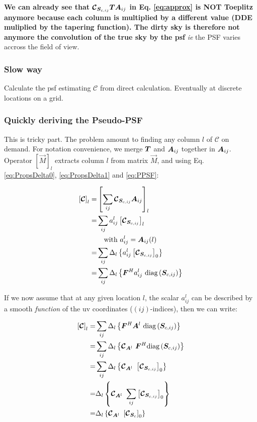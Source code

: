 {\bf We can already see that $\bm{\mathcal{C}}_{\bm{S}_{c,ij}}
  \bm{T}    \bm{A}_{ij}$ in Eq. \ref{eq:approx} is NOT Toeplitz anymore
  because each colunm is multiplied by a different value (DDE
  muliplied by the tapering function). The dirty sky is therefore not
  anymore the convolution of the true sky by the psf} {\it ie} the PSF
varies accross the field of view.

\subsubsection{Slow way}

Calculate the psf estimating $\mathcal{C}$ from direct
calculation. Eventually at discrete locations on a grid.


\subsubsection{Quickly deriving the Pseudo-PSF}

This is tricky part. The problem amount to finding any column $l$ of
$\bm{\mathcal{C}}$ on demand. For notation convenience, we merge
$\bm{T}$ and $\bm{A}_{ij}$ together in $\bm{A}_{ij}$. Operator
$\left[\vec{M}\right]_l$ extracts column $l$ from matrix $\vec{M}$,
and using Eq. \ref{eq:PropsDelta0}, \ref{eq:PropsDelta1} and \ref{eq:PPSF}:

\begin{alignat}{2}
\left[\bm{\mathcal{C}}\right]_l =&
     \left[\sum_{ij}  \C{\vv{S}_{c,ij}}  \vv{A}_{ij}\right]_l\\
=& \sum_{ij} a^l_{ij} \left[\C{\vv{S}_{c,ij}}\right]_l \\
&\ \ \ \text{with } a^l_{ij}=\vv{A}_{ij}(l)\\
=& \sum_{ij} \roll{a^l_{ij} \left[\C{\vv{S}_{c,ij}}\right]_0} \\
=& \sum_{ij} \roll{\Fm^H a^l_{ij}\ \text{diag}\left(\vv{S}_{c,ij}\right) }
\end{alignat}

If we now assume that at any given location $l$, the scalar $a^l_{ij}$
can be described by a smooth {\it function} of the uv coordinates
($(ij)$-indices), then we can write:

\begin{alignat}{2}
\left[\bm{\mathcal{C}}\right]_l =
& \sum_{ij} \roll{ \Fm^H \vv{A}^l\ \text{diag}\left(\vv{S}_{c,ij}\right) }\\
=& \sum_{ij} \roll{\C{\vv{A}^l}\ \Fm^H \text{diag}\left(\vv{S}_{c,ij}\right) }\\
=& \sum_{ij} \roll{\C{\vv{A}^l}\ \left[\C{\vv{S}_{c,ij}}\right]_0 }\\
=& \roll{\C{\vv{A}^l}\ \sum_{ij} \left[\C{\vv{S}_{c,ij}}\right]_0 }\\
=& \roll{\C{\vv{A}^l}\ \left[\C{\vv{S}_{c}}\right]_0 }\\
\end{alignat}

